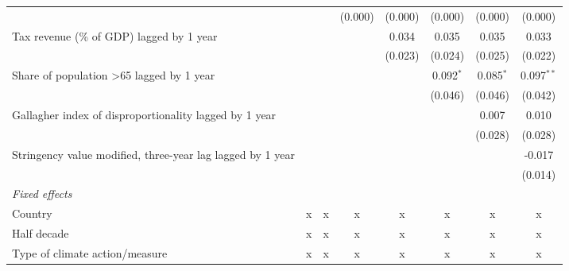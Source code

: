 \begin{tabular}{lccccccc}
                                                                                     &              &              & (0.000)      & (0.000)     & (0.000)       & (0.000)       & (0.000)\\   
   Tax revenue (\% of GDP) lagged by 1 year                                          &              &              &              & 0.034       & 0.035         & 0.035         & 0.033\\   
                                                                                     &              &              &              & (0.023)     & (0.024)       & (0.025)       & (0.022)\\   
   Share of population >65 lagged by 1 year                                          &              &              &              &             & 0.092$^{*}$   & 0.085$^{*}$   & 0.097$^{**}$\\   
                                                                                     &              &              &              &             & (0.046)       & (0.046)       & (0.042)\\   
   Gallagher index of disproportionality lagged by 1 year                            &              &              &              &             &               & 0.007         & 0.010\\   
                                                                                     &              &              &              &             &               & (0.028)       & (0.028)\\   
   Stringency value modified, three-year lag lagged by 1 year                        &              &              &              &             &               &               & -0.017\\   
                                                                                     &              &              &              &             &               &               & (0.014)\\   
   \emph{Fixed effects}\\
   Country                                                                           & x            & x            & x            & x           & x             & x             & x\\  
   Half decade                                                                       & x            & x            & x            & x           & x             & x             & x\\  
   Type of climate action/measure                                                    & x            & x            & x            & x           & x             & x             & x\\  

\end{tabular}
